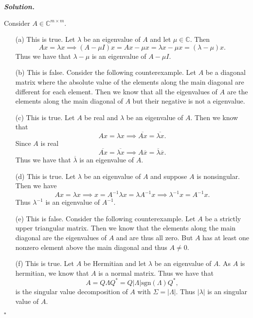 \documentclass[12pt]{report}
\newenvironment{solution}[1][\it{Solution}]{\textbf{#1. } }{$\square$}
\def\C{{\mathbb C}}
\begin{document}
\begin{solution}

    Consider $A \in \C^{m \times m}$.
    \noindent
    \begin{enumerate}
        \item [(a)]
        This is true. Let $\lambda$ be an eigenvalue of $A$ and let $\mu \in \C$. Then
        \[ 
            Ax = \lambda x \implies (A - \mu I)x = Ax - \mu x = \lambda x - \mu x = (\lambda - \mu)x.
        \]
        Thus we have that $\lambda - \mu$ is an eigenvalue of $A - \mu I$.

        \item [(b)]
        This is false. Consider the following counterexample. Let $A$ be a diagonal matrix where the absolute value of the elements along the main diagonal are different for each element. Then we know that all the eigenvalues of $A$ are the elements along the main diagonal of $A$ but their negative is not a eigenvalue. 
        
        \item [(c)]
        This is true. 
        Let $A$ be real and $\lambda$ be an eigenvalue of $A$. Then we know that
        \[ Ax = \lambda x \implies \overline{Ax} = \overline{\lambda x}.\]
        Since $A$ is real
        \[ 
            \overline{Ax} = \overline{\lambda x} \implies A\overline{x} = \overline{\lambda}\overline{x}.
        \]
        Thus we have that $\overline{\lambda}$ is an eigenvalue of $A$. 

        \item [(d)]
        This is true. Let $\lambda$ be an eigenvalue of $A$ and suppose $A$ is nonsingular. Then we have
        \[ Ax = \lambda x \implies x = A^{-1}\lambda x = \lambda A^{-1} x \implies \lambda^{-1}x = A^{-1}x.\]
        Thus $\lambda^{-1}$ is an eigenvalue of $A^{-1}$. 

        \item [(e)]
        This is false. Consider the following counterexample. Let $A$ be a strictly upper triangular matrix. Then we know that the elements along the main diagonal are the eigenvalues of $A$ and are thus all zero. But $A$ has at least one nonzero element above the main diagonal and thus $A \neq 0$.   
        
        \item [(f)]
        This is true. Let $A$ be Hermitian and let $\lambda$ be an eigenvalue of $A$. As $A$ is hermitian, we know that $A$ is a normal matrix. Thus we have that
        \[ A = Q\Lambda Q^* = Q |\Lambda| \text{sgn}(\Lambda)Q^*,\]
        is the singular value decomposition of $A$ with $\Sigma = |\Lambda|.$ Thus $|\lambda|$ is an singular value of $A$. 
        

\end{enumerate}
\end{solution}
\end{document}
